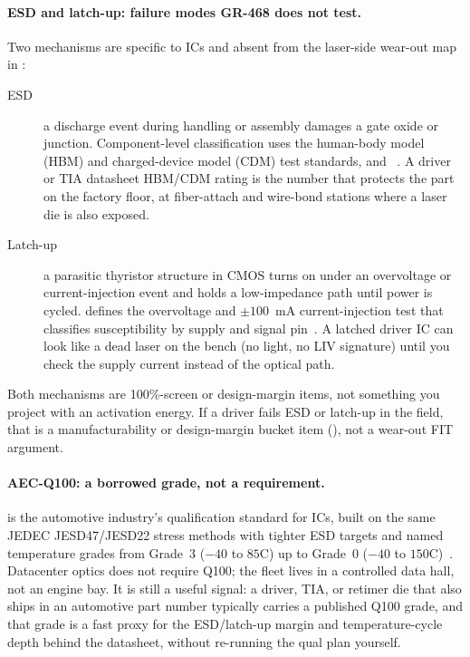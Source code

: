 \paragraph{ESD and latch-up: failure modes GR-468 does not test.}
Two mechanisms are specific to ICs and absent from the laser-side wear-out map in
:

\begin{description}
\item[ESD] a discharge event during handling or assembly damages a gate oxide or
      junction. Component-level classification uses the human-body model (HBM) and
      charged-device model (CDM) test standards,  and
      ~. A driver or TIA datasheet HBM/CDM rating is
      the number that protects the part on the factory floor, at fiber-attach and
      wire-bond stations where a laser die is also exposed.
\item[Latch-up] a parasitic thyristor structure in CMOS turns on under an
      overvoltage or current-injection event and holds a low-impedance path until
      power is cycled.  defines the overvoltage and
      $\pm100$~mA current-injection test that classifies susceptibility by supply
      and signal pin~. A latched driver IC can look like a dead
      laser on the bench (no light, no LIV signature) until you check the supply
      current instead of the optical path.
\end{description}

Both mechanisms are 100\%-screen or design-margin items, not something you
project with an activation energy. If a driver fails ESD or latch-up in the
field, that is a manufacturability or design-margin bucket item
(), not a wear-out FIT argument.

\paragraph{AEC-Q100: a borrowed grade, not a requirement.}
 is the automotive industry's qualification
standard for ICs, built on the same JEDEC JESD47/JESD22 stress methods with
tighter ESD targets and named temperature grades from Grade~3
($-40$ to $85$\textdegree C) up to Grade~0 ($-40$ to $150$\textdegree C)~.
Datacenter optics does not require Q100; the fleet lives in a controlled data hall,
not an engine bay. It is still a useful signal: a driver, TIA, or retimer die that
also ships in an automotive part number typically carries a published Q100 grade,
and that grade is a fast proxy for the ESD/latch-up margin and temperature-cycle
depth behind the datasheet, without re-running the qual plan yourself.


